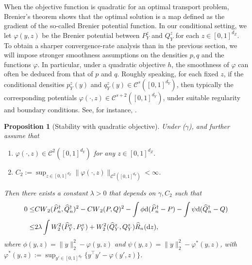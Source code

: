 \documentclass{article}
\theoremstyle{plain}
\newtheorem{proposition}{Proposition}[section]
\theoremstyle{definition}
\def\PP{P}
\def\QQ{Q}
\def\calC{\mathcal{C}}
\theoremstyle{plain}
\newcommand{\diff}{{\rm d}}
\def\calC{\mathcal{C}}
\newcommand{\Cwass}{{CW}}
\begin{document}
When the objective function is quadratic for an optimal transport problem, Brenier's theorem \parencite{knott1984optimal, brenier1991polar} shows that the optimal solution is a map defined as the gradient of the so-called Brenier potential function. In our conditional setting, we let $\varphi(y, z)$ be the Brenier potential between $\PP_Y^z$ and $\QQ_Y^z$ for each $z \in [0,1]^{d_Z}$. To obtain a sharper convergence-rate analysis than in the previous section, we will impose stronger smoothness assumptions on the densities $p,q$ and the functions $\varphi$. In particular, under a quadratic objective $h$, the smoothness of $\varphi$ can often be deduced from that of $p$ and $q$. Roughly speaking, for each fixed $z$, if the conditional densities $p_Y^z(y)$ and $q_Y^z(y) \in \calC^{s}([0,1]^{d_Y})$, then typically the corresponding potentials $\varphi(\cdot,z) \in \mathcal C^{s+2}([0,1]^{d_Y})$, under suitable regularity and boundary conditions. See, for instance, \cite[Chapter~12]{villani2008optimal}.



\begin{proposition}[Stability with quadratic objective]\label{prop:stability.COT}
     Under  ($\gamma$), and further assume that 
     \begin{enumerate}[label=(\roman*)]
         \item $\varphi(\cdot, z) \in \calC^2([0,1]^{d_Y})$ for any $z \in [0,1]^{d_Z}$.
         \item $C_2 :=\sup_{z\in[0,1]^{d_Z}}\|\varphi(\cdot, z)\|_{\calC^2([0,1]^{d_Y})}  < \infty$.
     \end{enumerate}
      Then there exists a constant $\lambda > 0$ that depends on $\gamma, C_2$ such that    
    \begin{align*}        
        0 \leq & \Cwass_2(\widehat P_n^{\dagger},\widehat Q_n^{\dagger})^2 - \Cwass_2(\PP,\QQ)^2 - \int \phi \diff (\widehat P_n^{\dagger} - \PP) 
        - \int \psi \diff (\widehat Q_n^{\dagger} - \QQ) \\
        \leq & 2\lambda \int W^2_2(\widehat \PP_Y^z, \PP_Y^z) + W^2_2(\widehat \QQ_Y^z, \QQ_Y^z) \widehat R_{n}(\diff z),
    \end{align*}
    where $\phi(y,z) = \|y\|^2_2 - \varphi(y,z)$ and $\psi(y,z) = \|y\|^2_2 - \varphi^*(y,z)$, with $\varphi^*(y,z) := \sup_{y' \in [0,1]^{d_Y}} \{y^\top y' - \varphi(y', z)\}$.
\end{proposition}
\end{document}
